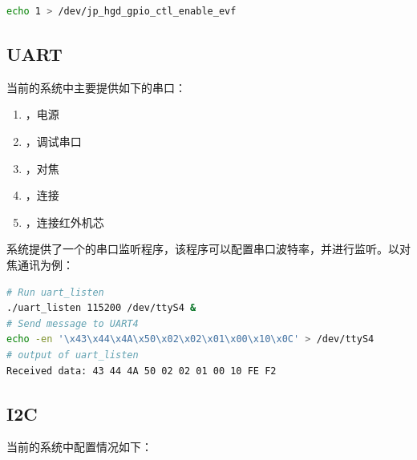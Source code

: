 \documentclass[UTF8]{ctexart}
\begin{document}
\begin{lstlisting}[language=sh]
echo 1 > /dev/jp_hgd_gpio_ctl_enable_evf
\end{lstlisting}


\subsection{UART}

当前的系统中主要提供如下的串口：

\begin{enumerate}
    \item {}，电源
    \item {}，调试串口
    \item {}，对焦
    \item {}，连接
    \item {}，连接红外机芯
\end{enumerate}

系统提供了一个的串口监听程序，该程序可以配置串口波特率，并进行监听。以对焦通讯为例：

\begin{lstlisting}[language=sh]
# Run uart_listen
./uart_listen 115200 /dev/ttyS4 &
# Send message to UART4
echo -en '\x43\x44\x4A\x50\x02\x02\x01\x00\x10\x0C' > /dev/ttyS4
# output of uart_listen
Received data: 43 44 4A 50 02 02 01 00 10 FE F2 
\end{lstlisting}
    

\subsection{I2C}

当前的系统中配置情况如下：
\end{document}
